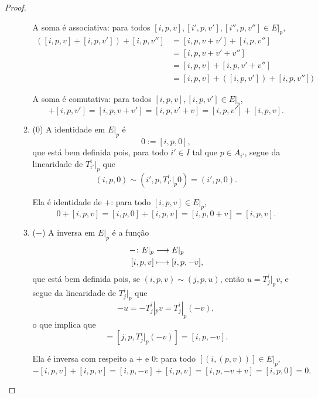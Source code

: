\begin{proof}
\begin{enumerate}
\begin{enumerate}
A soma é associativa: para todos $[i,p,v], [i',p,v'], [i'',p,v''] \in E|_p$,
	\begin{align*}
	([i,p,v] + [i,p,v']) + [i,p,v''] &= [i,p,v + v'] + [i,p,v''] \\
		&= [i,p,v + v' + v''] \\
		&= [i,p,v] + [i,p,v' + v''] \\
		&= [i,p,v] + ([i,p,v']) + [i,p,v''])
	\end{align*}

A soma é comutativa: para todos $[i,p,v], [i,p,v'] \in E|_p$,
	\begin{equation*}
	[i,p,v] + [i,p,v'] = [i,p,v + v'] = [i,p,v' + v] = [i,p,v'] + [i,p,v].
	\end{equation*}

	\item ($0$) A identidade em $E|_p$ é
	\begin{equation*}
	0 := [i,p,0],
	\end{equation*}
que está bem definida pois, para todo $i' \in I$ tal que $p \in A_{i'}$, segue da linearidade de $T^i_{i'}|_p$ que
	\begin{equation*}
	(i,p,0) \sim (i',p,T^i_{i'}|_p 0) = (i',p,0).
	\end{equation*}

Ela é identidade de $+$: para todo $[i,p,v] \in E|_p$,
	\begin{equation*}
	0 + [i,p,v] = [i,p,0] + [i,p,v] = [i,p,0 + v] = [i,p,v].
	\end{equation*}

	\item ($-$) A inversa em $E|_p$ é a função
	\begin{align*}
	{-}\colon {E|_p} &\longrightarrow {E|_p} \\{[i,p,v]} &\longmapsto [i,p,-v],
	\end{align*}
que está bem definida pois, se $(i,p,v) \sim (j,p,u)$, então $u=T^i_j|_p v$, e segue da linearidade de $T^i_j|_p$ que
	\begin{equation*}
	-u = -T^i_j|_p v = T^i_j|_p (-v),
	\end{equation*}
o que implica que
	\begin{equation*}
	[j,p,-u] = [j,p,T^i_j|_p (-v)] = [i,p,-v].
	\end{equation*}

Ela é inversa com respeito a $+$ e $0$: para todo $[(i,(p,v))] \in E|_p$,
	\begin{equation*}
	-[i,p,v] + [i,p,v] = [i,p,-v] + [i,p,v] = [i,p,-v+v] = [i,p,0] = 0.
	\end{equation*}
	\end{enumerate}


\end{enumerate}
\end{proof}
